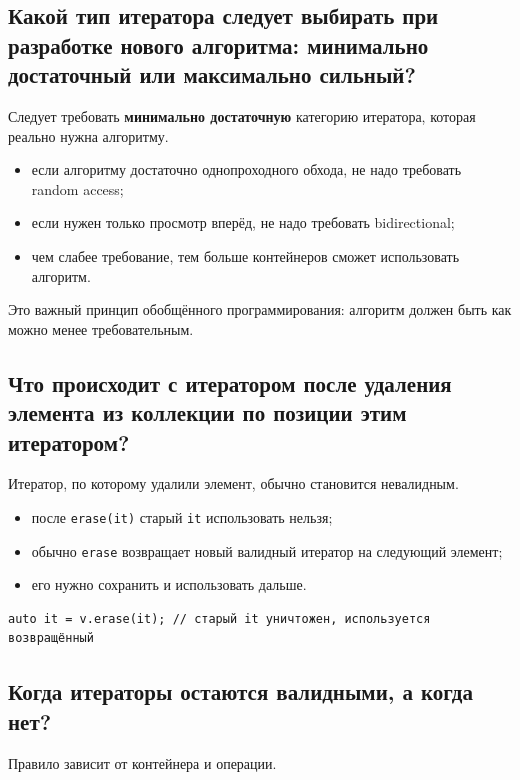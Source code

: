 \subsection{Какой тип итератора следует выбирать при разработке нового алгоритма: минимально достаточный или максимально сильный?}
Следует требовать \textbf{минимально достаточную} категорию итератора, которая реально нужна алгоритму.

\begin{itemize}
    \item если алгоритму достаточно однопроходного обхода, не надо требовать random access;
    \item если нужен только просмотр вперёд, не надо требовать bidirectional;
    \item чем слабее требование, тем больше контейнеров сможет использовать алгоритм.
\end{itemize}

\begin{remark}
Это важный принцип обобщённого программирования: алгоритм должен быть как можно менее требовательным.
\end{remark}

\subsection{Что происходит с итератором после удаления элемента из коллекции по позиции этим итератором?}
Итератор, по которому удалили элемент, обычно становится невалидным.

\begin{itemize}
    \item после \texttt{erase(it)} старый \texttt{it} использовать нельзя;
    \item обычно \texttt{erase} возвращает новый валидный итератор на следующий элемент;
    \item его нужно сохранить и использовать дальше.
\end{itemize}

\begin{example}
\begin{verbatim}
auto it = v.erase(it); // старый it уничтожен, используется возвращённый
\end{verbatim}
\end{example}

\subsection{Когда итераторы остаются валидными, а когда нет?}
Правило зависит от контейнера и операции.

